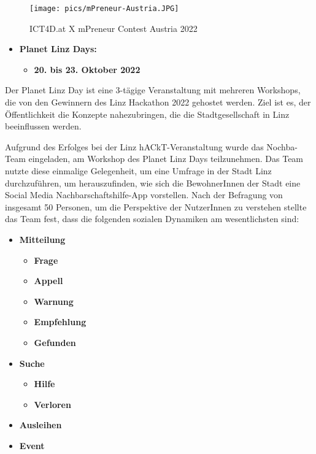 \begin{figure}[H]
    \centering
    \texttt{[image: pics/mPreneur-Austria.JPG]}
    \caption{ICT4D.at X mPreneur Contest Austria 2022}
    \label{fig:mpreneur}
\end{figure}

\begin{itemize}
    \item \textbf{Planet Linz Days:}
          \begin{itemize}
              \item \textbf{20. bis 23. Oktober 2022}
          \end{itemize}
\end{itemize}

Der Planet Linz Day ist eine 3-tägige Veranstaltung mit mehreren Workshops, die von den Gewinnern des Linz Hackathon 2022 gehostet werden. Ziel ist es, der Öffentlichkeit die Konzepte nahezubringen, die die Stadtgesellschaft in Linz beeinflussen werden.

Aufgrund des Erfolges bei der Linz hACkT-Veranstaltung wurde das Nochba-Team eingeladen, am Workshop des Planet Linz Days teilzunehmen. Das Team nutzte diese einmalige Gelegenheit, um eine Umfrage in der Stadt Linz durchzuführen, um herauszufinden, wie sich die BewohnerInnen der Stadt eine Social Media Nachbarschaftshilfe-App vorstellen. Nach der Befragung von insgesamt 50 Personen, um die Perspektive der NutzerInnen zu verstehen
stellte das Team fest, dass die folgenden sozialen Dynamiken am wesentlichsten sind:


\begin{itemize}
    \item \textbf{Mitteilung}
          \begin{itemize}
              \item \textbf{Frage}
              \item \textbf{Appell}
              \item \textbf{Warnung}
              \item \textbf{Empfehlung}
              \item \textbf{Gefunden}
          \end{itemize}
    \item \textbf{Suche}
          \begin{itemize}
              \item \textbf{Hilfe}
              \item \textbf{Verloren}
          \end{itemize}
    \item \textbf{Ausleihen}
    \item \textbf{Event}
\end{itemize}


